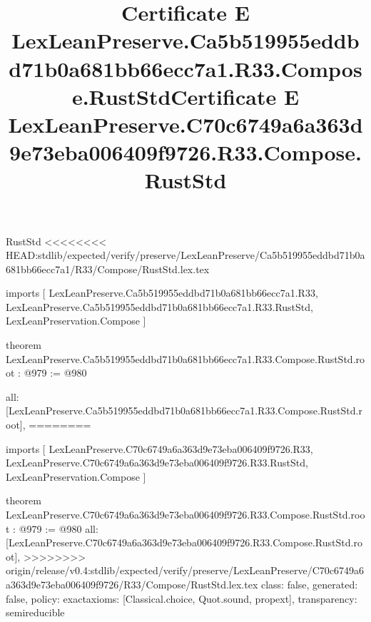 \begin{lexlean}{RustStd}
<<<<<<<< HEAD:stdlib/expected/verify/preserve/LexLeanPreserve/Ca5b519955eddbd71b0a681bb66ecc7a1/R33/Compose/RustStd.lex.tex
\title{Certificate E LexLeanPreserve.Ca5b519955eddbd71b0a681bb66ecc7a1.R33.Compose.RustStd}
\begin{coremodule}
imports [
  LexLeanPreserve.Ca5b519955eddbd71b0a681bb66ecc7a1.R33,
  LexLeanPreserve.Ca5b519955eddbd71b0a681bb66ecc7a1.R33.RustStd,
  LexLeanPreservation.Compose
]

theorem LexLeanPreserve.Ca5b519955eddbd71b0a681bb66ecc7a1.R33.Compose.RustStd.root : @979 := @980 {
  all: [LexLeanPreserve.Ca5b519955eddbd71b0a681bb66ecc7a1.R33.Compose.RustStd.root],
========
\title{Certificate E LexLeanPreserve.C70c6749a6a363d9e73eba006409f9726.R33.Compose.RustStd}
\begin{coremodule}
imports [
  LexLeanPreserve.C70c6749a6a363d9e73eba006409f9726.R33,
  LexLeanPreserve.C70c6749a6a363d9e73eba006409f9726.R33.RustStd,
  LexLeanPreservation.Compose
]

theorem LexLeanPreserve.C70c6749a6a363d9e73eba006409f9726.R33.Compose.RustStd.root : @979 := @980 {
  all: [LexLeanPreserve.C70c6749a6a363d9e73eba006409f9726.R33.Compose.RustStd.root],
>>>>>>>> origin/release/v0.4:stdlib/expected/verify/preserve/LexLeanPreserve/C70c6749a6a363d9e73eba006409f9726/R33/Compose/RustStd.lex.tex
  class: false,
  generated: false,
  policy: exact{axioms: [Classical.choice, Quot.sound, propext]},
  transparency: semireducible
}


\end{coremodule}}
\end{coremodule}
\end{lexlean}

